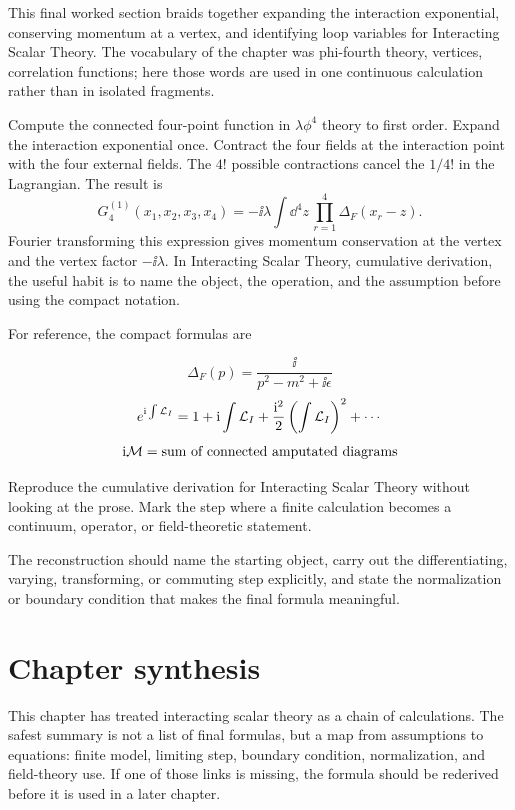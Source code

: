This final worked section braids together expanding the interaction exponential, conserving momentum at a vertex, and identifying loop variables for Interacting Scalar Theory.  The vocabulary of the chapter was phi-fourth theory, vertices, correlation functions; here those words are used in one continuous calculation rather than in isolated fragments.

Compute the connected four-point function in \(\lambda\phi^4\) theory to first order.  Expand the interaction exponential once.  Contract the four fields at the interaction point with the four external fields.  The \(4!\) possible contractions cancel the \(1/4!\) in the Lagrangian.  The result is
\[
  G_4^{(1)}(x_1,x_2,x_3,x_4)=
  -\ii\lambda\int\dd^4z\,\prod_{r=1}^4\Delta_F(x_r-z).
\]
Fourier transforming this expression gives momentum conservation at the vertex and the vertex factor \(-\ii\lambda\).  In Interacting Scalar Theory, cumulative derivation, the useful habit is to name the object, the operation, and the assumption before using the compact notation.

For reference, the compact formulas are

\[
  \Delta_F(p)=\frac{\ii}{p^2-m^2+\ii\epsilon}
\]
\[
  e^{\mathrm i\int\mathcal L_I}=1+\mathrm i\int\mathcal L_I+\frac{\mathrm i^2}{2}\left(\int\mathcal L_I\right)^2+\cdots
\]
\[
  \mathrm i\mathcal M=\hbox{sum of connected amputated diagrams}
\]

\begin{exercise}
Reproduce the cumulative derivation for Interacting Scalar Theory without looking at the prose.  Mark the step where a finite calculation becomes a continuum, operator, or field-theoretic statement.
\begin{answer}
The reconstruction should name the starting object, carry out the differentiating, varying, transforming, or commuting step explicitly, and state the normalization or boundary condition that makes the final formula meaningful.
\end{answer}
\end{exercise}



\section{Chapter synthesis}

This chapter has treated interacting scalar theory as a chain of calculations.  The safest summary is not a list of final formulas, but a map from assumptions to equations: finite model, limiting step, boundary condition, normalization, and field-theory use.  If one of those links is missing, the formula should be rederived before it is used in a later chapter.

